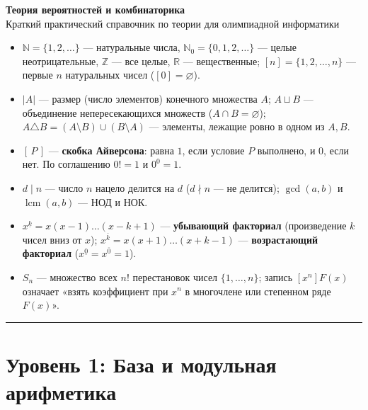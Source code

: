 \documentclass[10pt,a4paper]{article}
\renewcommand{\emptyset}{\varnothing}
\newcommand{\N}{\mathbb{N}}
\newcommand{\Z}{\mathbb{Z}}
\newcommand{\R}{\mathbb{R}}
\newcommand{\iverson}[1]{[\,#1\,]}
\newcommand{\fall}[2]{#1^{\underline{#2}}}
\newcommand{\rise}[2]{#1^{\overline{#2}}}
\DeclareMathOperator{\lcm}{lcm}
\begin{document}
\thispagestyle{plain}

\begin{center}
  {\LARGE\bfseries\color{AccentBlue} Теория вероятностей и комбинаторика}\\[4pt]
  {\normalsize Краткий практический справочник по теории для олимпиадной информатики}
\end{center}
\vspace{2pt}

\begin{summarybox}[title={Базовые обозначения и соглашения}]
\begin{itemize}
  \item $\N = \{1, 2, \dots\}$ — натуральные числа, $\N_0 = \{0, 1, 2, \dots\}$ — целые неотрицательные, $\Z$ — все целые, $\R$ — вещественные; $[n] = \{1, 2, \dots, n\}$ — первые $n$ натуральных чисел ($[0] = \emptyset$).
  \item $|A|$ — размер (число элементов) конечного множества $A$; $A \sqcup B$ — объединение непересекающихся множеств ($A \cap B = \emptyset$); $A \triangle B = (A \setminus B) \cup (B \setminus A)$ — элементы, лежащие ровно в одном из $A, B$.
  \item $\iverson{P}$ — \textbf{скобка Айверсона}: равна $1$, если условие $P$ выполнено, и $0$, если нет. По соглашению $0! = 1$ и $0^0 = 1$.
  \item $d \mid n$ — число $n$ нацело делится на $d$ ($d \nmid n$ — не делится); $\gcd(a, b)$ и $\lcm(a, b)$ — НОД и НОК.
  \item $\fall{x}{k} = x(x-1)\dots(x-k+1)$ — \textbf{убывающий факториал} (произведение $k$ чисел вниз от $x$); $\rise{x}{k} = x(x+1)\dots(x+k-1)$ — \textbf{возрастающий факториал} ($\fall{x}{0} = \rise{x}{0} = 1$).
  \item $S_n$ — множество всех $n!$ перестановок чисел $\{1, \dots, n\}$; запись $[x^n] F(x)$ означает «взять коэффициент при $x^n$ в многочлене или степенном ряде $F(x)$».
\end{itemize}
\end{summarybox}

{\small\tableofcontents}
\vspace{4pt}
\hrule
\vspace{6pt}

\section{Уровень 1: База и модульная арифметика}
\end{document}
